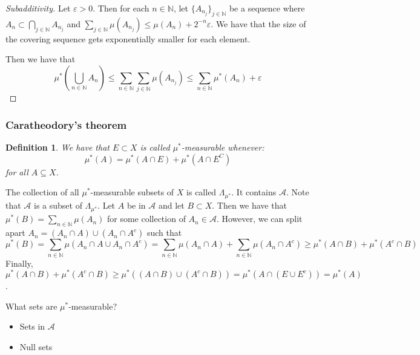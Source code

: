 \documentclass{article}
\newtheorem{definition}[theorem]{Definition}
\theoremstyle{definition}
\numberwithin{theorem}{section}
\numberwithin{equation}{section}
\newcommand{\alg}{\mathcal{A}}
\newcommand{\sigmes}{\Lambda_{\mu^*}}
\begin{document}
\begin{proof}[Subadditivity]
	Let $\varepsilon > 0$. Then for each $n \in \mathbb{N}$, let $\lbrace A_{n_j} \rbrace_{j \in \mathbb{N}}$ be a sequence where $A_n \subset \bigcap_{j \in \mathbb{N}}  A_{n_j}$ and $\sum_{j \in \mathbb{N}}\mu(A_{n_j}) \leq \mu(A_n) + 2^{-n} \varepsilon$. We have that the size of the covering sequence gets exponentially smaller for each element. 
	
	Then we have that 
	\begin{equation}
		\mu^* \left(\bigcup_{n \in \mathbb{N}}A_n \right) \leq \sum_{n \in \mathbb{N}} \sum_{j \in \mathbb{N}} \mu(A_{n_j}) \leq \sum_{n \in \mathbb{N}}\mu^*(A_n) + \varepsilon
	\end{equation}
\end{proof}

\subsubsection{Caratheodory's theorem}

\begin{definition}
	We have that $E \subset X$ is called $\mu^*$-measurable whenever:
	\begin{equation}
			\mu^*(A) = \mu^*(A \cap E) + \mu^*(A \cap E^C)
	\end{equation}
	 for all $A \subseteq X$.
\end{definition}
The collection of all $\mu^*$-measurable subsets of $X$ is called $\sigmes$. It contains $\alg$.
Note that $ \alg$ is a subset of $\sigmes$. Let $A$ be in $\alg$ and let $B \subset X$. Then we have that $\mu^*(B) = \sum_{n \in \mathbb{N}}\mu(A_n)$ for some collection of $A_n \in \alg$. However, we can split apart $A_n = (A_n \cap A) \cup (A_n \cap A^c)$ such that
\begin{equation}
	\mu^*(B) = \sum_{n \in \mathbb{N}}\mu(A_n\cap A \cup A_n \cap A^c) = \sum_{n \in \mathbb{N}} \mu(A_n \cap A) + \sum_{n \in \mathbb{N}} \mu(A_n \cap A^c) \geq \mu^*(A \cap B) + \mu^*(A^c \cap B)
\end{equation}
 Finally, $\mu^*(A \cap B) + \mu^*(A^c \cap B) \geq \mu^*((A \cap B) \cup (A^c \cap B)) = \mu^*(A \cap (E \cup E^c)) = \mu^*(A)$. 

What sets are $\mu^*$-measurable?
\begin{itemize}
	\item Sets in $\alg$
	\item Null sets
\end{itemize}
\end{document}
